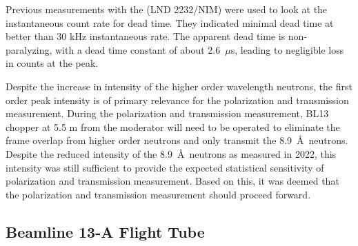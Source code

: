 Previous measurements with the (LND 2232/NIM) were used to look at the instantaneous count rate for dead time. They indicated minimal dead time at better than 30 kHz instantaneous rate. The apparent dead time is non-paralyzing, with a dead time constant of about 2.6~$\mu$s, leading to negligible loss in counts at the peak.

Despite the increase in intensity of the higher order wavelength neutrons, the first order peak intensity is of primary relevance for the polarization and transmission measurement. During the polarization and transmission measurement, BL13 chopper at 5.5 m from the moderator will need to be operated to eliminate the frame overlap from higher order neutrons and only transmit the 8.9~\AA\ neutrons. Despite the reduced intensity of the 8.9~\AA\ neutrons as measured in 2022, this intensity was still sufficient to provide the expected statistical sensitivity of polarization and transmission measurement. Based on this, it was deemed that the polarization and transmission measurement should proceed forward.    





\subsection{Beamline 13-A Flight Tube}

